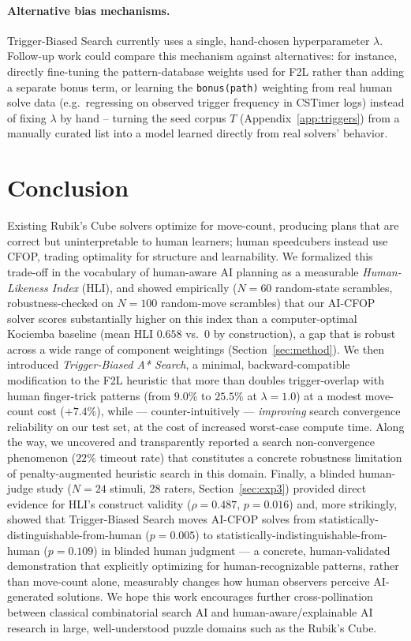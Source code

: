 \documentclass[10pt,conference]{article}
\begin{document}
\paragraph{Alternative bias mechanisms.} Trigger-Biased Search
currently uses a single, hand-chosen hyperparameter $\lambda$.
Follow-up work could compare this mechanism against alternatives: for
instance, directly fine-tuning the pattern-database weights used for
F2L rather than adding a separate bonus term, or learning the
\texttt{bonus(path)} weighting from real human solve data (e.g.\
regressing on observed trigger frequency in CSTimer logs) instead of
fixing $\lambda$ by hand -- turning the seed corpus $T$
(Appendix~\ref{app:triggers}) from a manually curated list into a
model learned directly from real solvers' behavior.

\section{Conclusion}
Existing Rubik's Cube solvers optimize for move-count, producing
plans that are correct but uninterpretable to human learners; human
speedcubers instead use CFOP, trading optimality for structure and
learnability. We formalized this trade-off in the vocabulary of
human-aware AI planning as a measurable \emph{Human-Likeness Index}
(HLI), and showed empirically ($N=60$ random-state scrambles,
robustness-checked on $N=100$ random-move scrambles) that our
AI-CFOP solver scores substantially higher on this index than a
computer-optimal Kociemba baseline (mean HLI $0.658$ vs.\ $0$ by
construction), a gap that is robust across a wide range of
component weightings (Section~\ref{sec:method}). We then introduced
\emph{Trigger-Biased A* Search}, a minimal, backward-compatible
modification to the F2L heuristic that more than doubles
trigger-overlap with human finger-trick patterns (from $9.0\%$ to
$25.5\%$ at $\lambda=1.0$) at a modest move-count cost ($+7.4\%$),
while --- counter-intuitively --- \emph{improving} search
convergence reliability on our test set, at the cost of increased
worst-case compute time. Along the way, we uncovered and
transparently reported a search non-convergence phenomenon
($22\%$ timeout rate) that constitutes a concrete robustness
limitation of penalty-augmented heuristic search in this domain.
Finally, a blinded human-judge study ($N=24$ stimuli, 28 raters,
Section~\ref{sec:exp3}) provided direct evidence for HLI's construct
validity ($\rho=0.487$, $p=0.016$) and, more strikingly, showed that
Trigger-Biased Search moves AI-CFOP solves from
statistically-distinguishable-from-human ($p=0.005$) to
statistically-indistinguishable-from-human ($p=0.109$) in blinded
human judgment --- a concrete, human-validated demonstration that
explicitly optimizing for human-recognizable patterns, rather than
move-count alone, measurably changes how human observers perceive
AI-generated solutions. We hope this work encourages further
cross-pollination between classical combinatorial search AI and
human-aware/explainable AI research in large, well-understood puzzle
domains such as the Rubik's Cube.
\end{document}
